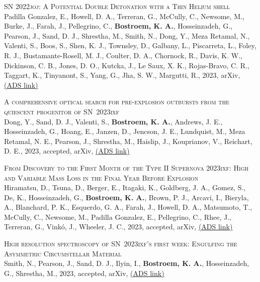 \begin{revnumerate}[67]
\item{\textsc{SN 2022joj: A Potential Double Detonation with a Thin Helium shell}\\ 
Padilla Gonzalez, E., Howell, D. A., Terreran, G., McCully, C., Newsome, M., Burke, J., Farah, J., Pellegrino, C., \textbf{Bostroem, K. A.}, Hosseinzadeh, G., Pearson, J., Sand, D. J., Shrestha, M., Smith, N., Dong, Y., Meza Retamal, N., Valenti, S., Boos, S., Shen, K. J., Townsley, D., Galbany, L., Piscarreta, L., Foley, R. J., Bustamante-Rosell, M. J., Coulter, D. A., Chornock, R., Davis, K. W., Dickinson, C. B., Jones, D. O., Kutcka, J., Le Saux, X. K., Rojas-Bravo, C. R., Taggart, K., Tinyanont, S., Yang, G., Jha, S. W., Margutti, R., 2023, arXiv, 
\color{blue}\href{https://ui.adsabs.harvard.edu/abs/2023arXiv230806334P}{(ADS link)}\color{black}}\\

\item{\textsc{A comprehensive optical search for pre-explosion outbursts from the quiescent progenitor of SN~2023ixf}\\ 
Dong, Y., Sand, D. J., Valenti, S., \textbf{Bostroem, K. A.}, Andrews, J. E., Hosseinzadeh, G., Hoang, E., Janzen, D., Jencson, J. E., Lundquist, M., Meza Retamal, N. E., Pearson, J., Shrestha, M., Haislip, J., Kouprianov, V., Reichart, D. E., 2023, accepted, arXiv, 
\color{blue}\href{https://ui.adsabs.harvard.edu/abs/2023arXiv230702539D}{(ADS link)}\color{black}}\\

\item{\textsc{From Discovery to the First Month of the Type II Supernova 2023ixf: High and Variable Mass Loss in the Final Year Before Explosion}\\ 
Hiramatsu, D., Tsuna, D., Berger, E., Itagaki, K., Goldberg, J. A., Gomez, S., De, K., Hosseinzadeh, G., \textbf{Bostroem, K. A.}, Brown, P. J., Arcavi, I., Bieryla, A., Blanchard, P. K., Esquerdo, G. A., Farah, J., Howell, D. A., Matsumoto, T., McCully, C., Newsome, M., Padilla Gonzalez, E., Pellegrino, C., Rhee, J., Terreran, G., Vinkó, J., Wheeler, J. C., 2023, accepted, arXiv, 
\color{blue}\href{https://ui.adsabs.harvard.edu/abs/2023arXiv230703165H}{(ADS link)}\color{black}}\\

\item{\textsc{High resolution spectroscopy of SN~2023ixf's first week: Engulfing the Asymmetric Circumstellar Material}\\ 
Smith, N., Pearson, J., Sand, D. J., Ilyin, I., \textbf{Bostroem, K. A.}, Hosseinzadeh, G., Shrestha, M., 2023, accepted, arXiv, 
\color{blue}\href{https://ui.adsabs.harvard.edu/abs/2023arXiv230607964S}{(ADS link)}\color{black}}\\


\end{revnumerate}
